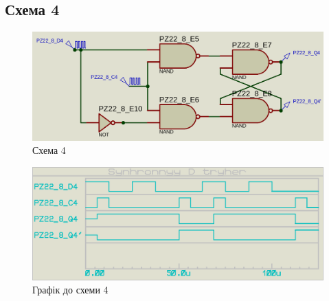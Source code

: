\documentclass{article}
\begin{document}
\begin{normalsize}
	\section*{Схема 4}	
	\begin{figure}[H]
		\centering
		\includegraphics[scale=0.25]{s4}	
		\caption{Схема 4}
	\end{figure}
	
	\begin{figure}[H]
		\centering
		\includegraphics[scale=0.25]{g4}	
		\caption{Графік до схеми 4}
	\end{figure}


\end{normalsize}
\end{document}
